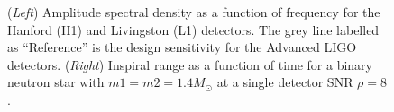 \documentclass[binding=0.6cm, LaM]{sapthesis}
\begin{document}
        \begin{figure}[!t]
          \noindent
          \label{asd}
          \centering
          \caption{(\textit{Left}) Amplitude spectral density as a function of frequency for the Hanford (H1) and Livingston (L1) detectors. The grey line labelled as ``Reference'' is the design sensitivity for the Advanced LIGO detectors. (\textit{Right}) Inspiral range as a function of time for a binary neutron star with $m1 = m2 = 1.4 M_\odot$ at a single detector SNR $\rho = 8$.}
          \label{fig:asd}
        \end{figure}
\end{document}
